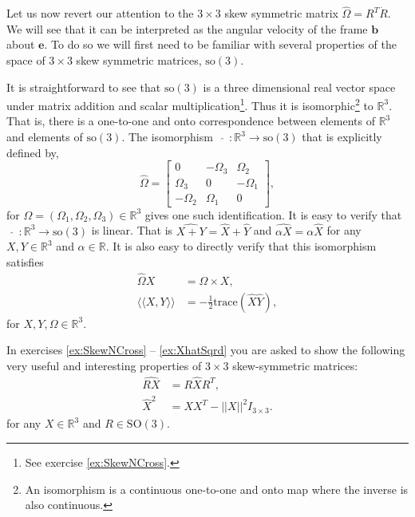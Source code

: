 \documentclass[graybox,envcountchap,sectrefs]{svmonoMuga}
\begin{document}
Let us now revert our attention to the $3\times 3$ skew symmetric matrix $\widehat{\Omega}=R^T\dot{R}$. We will see that it can be interpreted as the angular velocity of the frame $\mathbf{b}$ about $\mathbf{e}$. To do so we will first need to be familiar with several properties of the space of $3\times 3$ skew symmetric matrices, $\mathrm{so}(3)$.

It is straightforward to see that $\mathrm{so}(3)$ is a three dimensional real vector space under matrix addition and scalar multiplication\footnote{See exercise  \ref{ex:SkewNCross}.}. Thus it is isomorphic\footnote{An isomorphism is a continuous one-to-one and onto map where the inverse is also continuous.} to $\mathbb{R}^3$. That is, there is a one-to-one and onto correspondence between elements of $\mathbb{R}^3$ and elements of $\mathrm{so}(3)$. The isomorphism $\:\:\:\widehat{}\:\:: \mathbb{R}^3\to \mathrm{so}(3)$ that is explicitly defined by,
\begin{equation}\label{eq:SkewSymmetric0}
\widehat{\Omega}=\left[ \begin{array}{ccc} 0 & -\Omega_3 & \Omega_2 \\ \Omega_3 & 0 & -\Omega_1 \\ -\Omega_2 & \Omega_1 & 0\end{array}\right],
\end{equation}
for $\Omega =(\Omega_1,\Omega_2,\Omega_3)\in \mathbb{R}^3$ gives one such identification. It is easy to verify that $\:\:\:\widehat{}\:\:: \mathbb{R}^3\to \mathrm{so}(3)$ is linear. That is $\widehat{X+Y}=\widehat{X}+\widehat{Y}$ and $\widehat{\alpha X}=\alpha \widehat{X}$ for any $X,Y\in \mathbb{R}^3$ and $\alpha\in \mathbb{R}$.
It is also easy to directly verify that this isomorphism satisfies
\begin{align}
\widehat{\Omega}X&=\Omega \times X,\label{eq:HatNCross}\\
\langle\langle X,Y\rangle\rangle &=-\frac{1}{2}\mathrm{trace}{(\widehat{X}\widehat{Y})},
\end{align}
for $X,Y,\Omega\in \mathbb{R}^3$.

In exercises \ref{ex:SkewNCross} -- \ref{ex:XhatSqrd} you are asked to show the following very useful and  interesting properties of $3\times 3$ skew-symmetric matrices:
\begin{align}
\widehat{RX}&=R\widehat{X}R^T,\label{eq:AdjointAction}\\
\widehat{X}^2&= XX^T-||X||^2I_{3\times3}. \label{eq:OmegaHatSqrd}
\end{align}
for any $X\in \mathbb{R}^3$ and $R\in \mathrm{SO}(3)$.
\end{document}
